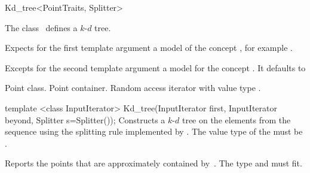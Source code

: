 

\begin{ccRefClass}{Kd_tree<PointTraits, Splitter>}  %


\ccDefinition  
The class \ccRefName\ defines a $k$-$d$ tree.


\ccParameters

Expects for the first template argument a model of the concept
, for example .

Excepts for the second template argument a model for the concept .
It defaults  to 

\ccTypes

 {Point class.}
 {Point container.}
 {Random access iterator 
with value type .}


\ccCreation
{}

\ccConstructor
{template <class InputIterator> Kd_tree(InputIterator first, InputIterator beyond, Splitter s=Splitter());}
{
Constructs a $k$-$d$ tree on the elements from the sequence 
 using the splitting rule implemented by . 
The value type of the  must be .
}

\ccOperations

{Reports the points that are approximately contained by~.
The type  and  must fit.} 


\end{ccRefClass}
